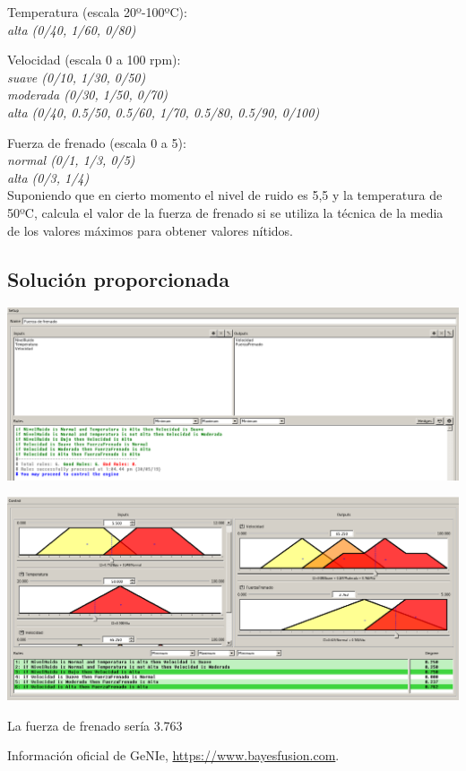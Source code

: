 \documentclass{article}
\newcommand\tab[1][1cm]{\hspace*{#1}}
\begin{document}
Temperatura (escala 20º-100ºC):\\
\tab \textit{alta (0/40, 1/60, 0/80)}

Velocidad (escala 0 a 100 rpm):\\
\tab \textit{suave (0/10, 1/30, 0/50)}\\
\tab \textit{moderada (0/30, 1/50, 0/70)}\\
\tab \textit{alta (0/40, 0.5/50, 0.5/60, 1/70, 0.5/80, 0.5/90, 0/100)}

Fuerza de frenado (escala 0 a 5):\\
\tab \textit{normal (0/1, 1/3, 0/5)}\\
\tab \textit{alta (0/3, 1/4)}\\
Suponiendo que en cierto momento el nivel de ruido es 5,5 y la temperatura de 50ºC, calcula el valor de la fuerza de frenado si se utiliza la técnica de la media de los valores máximos para obtener valores nítidos.

\subsection{Solución proporcionada}

\begin{center}
\includegraphics[scale=0.3]{images/ej4.png}
\end{center}

\begin{center}
\includegraphics[scale=0.3]{images/ej42.png}
\end{center}

La fuerza de frenado sería 3.763

\begin{thebibliography}{9}
 Información oficial de GeNIe, \url{https://www.bayesfusion.com}.
\end{thebibliography}
\end{document}
